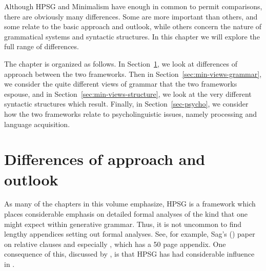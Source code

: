 \documentclass[output=paper]{langsci/langscibook}
\begin{document}
Although HPSG and Minimalism have enough in common to permit comparisons, there are obviously many differences. Some are more important than others, and some relate to the basic approach and outlook, while others concern the nature of grammatical systems and syntactic structures. In this chapter we will explore the full range of differences.

The chapter is organized as follows. In Section~\ref{sec:min-difference}, we look at differences of
approach between the two frameworks. Then in Section~\ref{sec:min-views-grammar}, we consider the
quite different views of grammar that the two frameworks espouse, and in
Section~\ref{sec:min-views-structure}, we look at the very different syntactic structures which
result. Finally, in Section~\ref{sec-psycho}, we consider how the two frameworks relate to
psycholinguistic issues, namely processing and language acquisition.

\section{Differences of approach and outlook}
\label{sec:min-difference}

As many of the chapters in this volume emphasize, HPSG is a framework which places considerable
emphasis on detailed formal analyses of the kind that one might expect within generative
grammar. Thus, it is not uncommon to find lengthy appendices setting out formal analyses. See, for
example, Sag's (\citeyear{Sag97a}) paper on  relative clauses and especially
\citet{GSag2000a-u}, which has a 50 page appendix. One consequence of this, discussed by
, is that HPSG has had considerable influence in .
\end{document}
